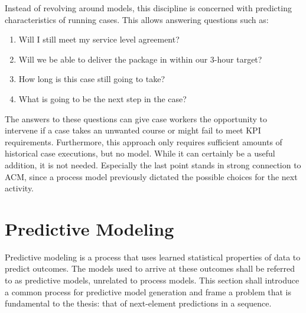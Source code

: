 Instead of revolving around models, this discipline is concerned with predicting characteristics of running cases. This allows answering questions such as:

\begin{enumerate}
    \item Will I still meet my service level agreement?
    \item Will we be able to deliver the package in within our 3-hour target?
    \item How long is this case still going to take?
    \item What is going to be the next step in the case?
\end{enumerate}

The answers to these questions can give case workers the opportunity to intervene if a case takes an unwanted course or might fail to meet KPI requirements. Furthermore, this approach only requires sufficient amounts of historical case executions, but no model. While it can certainly be a useful addition, it is not needed. Especially the last point stands in strong connection to ACM, since a process model previously dictated the possible choices for the next activity.


\section{Predictive Modeling}
Predictive modeling is a process that uses learned statistical properties of data to predict outcomes. The models used to arrive at these outcomes shall be referred to as predictive models, unrelated to process models. This section shall introduce a common process for predictive model generation and frame a problem that is fundamental to the thesis: that of next-element predictions in a sequence.

